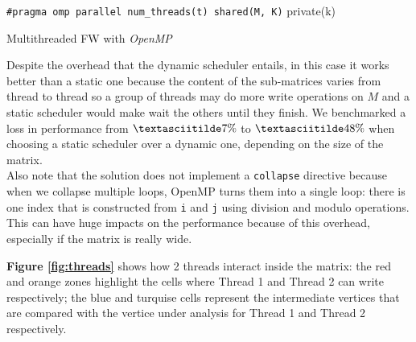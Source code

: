 \begin{algorithm}[h!]

\SetAlgoLined

\texttt{\#pragma omp parallel num\_threads(t) shared(M, K)} private(k) \\

 
\caption{Multithreaded FW with \emph{OpenMP}}\label{alg:omp}
\end{algorithm}


Despite the overhead that the dynamic scheduler entails, in this case it works better than a static one because the
content of the sub-matrices varies from thread to thread so a group of threads may do more write operations on $M$ and a
static scheduler would make wait the others until they finish. We benchmarked a loss in performance from $\textasciitilde7\%$ to $\textasciitilde48\%$ when choosing a static scheduler over
a dynamic one, depending on the size of the matrix.
 \\
Also note that the solution does not implement a \texttt{collapse} directive because when we collapse multiple loops, OpenMP turns them into a single loop: there is one
index that is constructed from \texttt{i} and \texttt{j} using division and modulo operations. This can
have huge impacts on the performance because of this overhead, especially if the matrix is really wide.

\textbf{Figure \ref*{fig:threads}} shows how 2 threads interact inside the matrix: the red and orange zones highlight the cells where
Thread 1 and Thread 2 can write respectively; the blue and turquise cells represent the intermediate vertices that are compared
with the vertice under analysis for Thread 1 and Thread 2 respectively.


